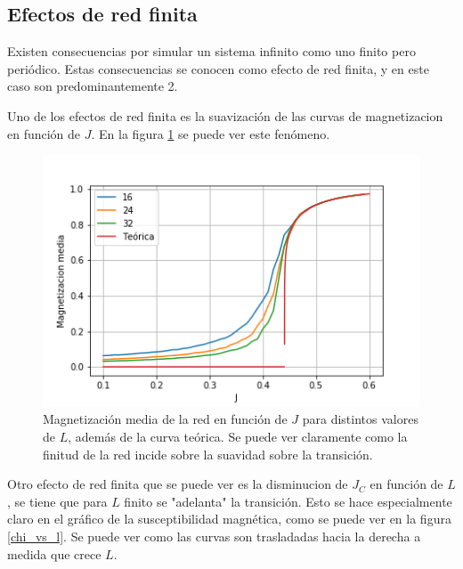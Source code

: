 \documentclass[%
 reprint,
 amsmath,amssymb,
 aps,
]{revtex4-1}
\begin{document}
\subsection{Efectos de red finita}

Existen consecuencias por simular un sistema infinito como uno finito pero
peri\'odico. Estas consecuencias se conocen como efecto de red finita, y en
este caso son predominantemente 2.

Uno de los efectos de red finita es la suavizaci\'on de las curvas de
magnetizacion en funci\'on de $J$. En la figura \ref{magnetization_vs_l} se
puede ver este fen\'omeno.

\begin{figure}
  \includegraphics[width=1.0\columnwidth]{images/magnetization_vs_l.png}
  \caption{Magnetizaci\'on media de la red en funci\'on de $J$ para distintos
  valores de $L$, adem\'as de la curva te\'orica. Se puede ver claramente como
  la finitud de la red incide sobre la suavidad sobre la transici\'on.}
  \label{magnetization_vs_l}
\end{figure}

Otro efecto de red finita que se puede ver es la disminucion de $J_C$ en
funci\'on de $L$, se tiene que para $L$ finito se "adelanta" la transici\'on.
Esto se hace especialmente claro en el gr\'afico de la susceptibilidad
magn\'etica, como se puede ver en la figura \ref{chi_vs_l}. Se puede ver como
las curvas son trasladadas hacia la derecha a medida que crece $L$.
\end{document}
